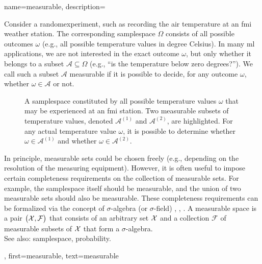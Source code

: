 {name={measurable}, 
	description={Consider a \gls{randomexperiment}, such as recording the air temperature at an \gls{fmi} weather station. 
		The corresponding \gls{samplespace} $\Omega$ consists of all possible outcomes $\omega$ (e.g., 
		all possible temperature values in degree Celsius). In many \gls{ml} applications, we are not interested 
		in the exact outcome $\omega$, but only whether it belongs to a subset $\mathcal{A} \subseteq \Omega$ 
		(e.g., “is the temperature below zero degrees?”). We call such a subset $\mathcal{A}$ measurable if it is 
		possible to decide, for any outcome $\omega$, whether $\omega \in \mathcal{A}$ or not. 
		\begin{figure}[H]
		\begin{center}
			\vspace*{10mm}
			\end{center}
			\caption{A \gls{samplespace} constituted by all possible temperature values $\omega$ 
			that may be experienced at an \gls{fmi} station. Two measurable subsets of temperature 
			values, denoted $\mathcal{A}^{(1)}$ and $\mathcal{A}^{(2)}$, are highlighted. For any 
			actual temperature value $\omega$, it is possible to determine whether $\omega \in \mathcal{A}^{(1)}$ 
			and whether $\omega \in \mathcal{A}^{(2)}$.} 
		\end{figure}
		In principle, measurable sets could be chosen freely (e.g., depending on the resolution of the 
		measuring equipment). However, it is often useful to impose certain completeness requirements 
		on the collection of measurable sets. For example, the \gls{samplespace} itself should be 
		measurable, and the union of two measurable sets should also be measurable. These completeness 
		requirements can be formalized via the concept of $\sigma$-algebra (or $\sigma$-field) 
		\cite{RudinBook}, \cite{BillingsleyProbMeasure}, \cite{durrett2010probability}. 
		A measurable space is a pair $\big(\mathcal{X},\mathcal{F}\big)$ that consists of an arbitrary set $\mathcal{X}$ and a 
		collection $\mathcal{F}$ of measurable subsets of $\mathcal{X}$ that form a $\sigma$-algebra. 
		\\
		See also: \gls{samplespace}, \gls{probability}.},
	first={measurable},
	text={measurable} 
}

